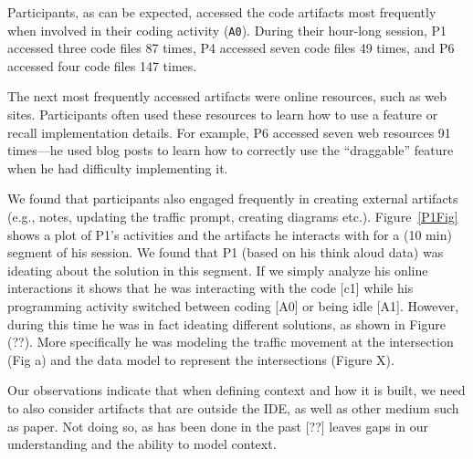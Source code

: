 Participants, as can be expected, accessed the code artifacts most frequently when involved in their coding activity (\texttt{A0}). During their hour-long session, P1 accessed three code files 87 times, P4 accessed seven code files 49 times, and P6 accessed four code files 147 times. 

The next most frequently accessed artifacts were online resources, such as web sites. Participants often used these resources to learn how to use a feature or recall implementation details. For example, P6 accessed seven web resources 91 times---he used blog posts to learn how to correctly use the ``draggable'' feature when he had difficulty implementing it.

We found that participants also engaged frequently in creating external artifacts (e.g., notes, updating the traffic prompt, creating diagrams etc.). Figure~\ref{P1Fig} shows a plot of P1's activities and the artifacts he interacts with for a (10 min) segment of his session. We found that P1 (based on his think aloud data) was ideating about the solution in this segment. If we simply analyze his online interactions it shows that he was interacting with the code [c1] while his programming activity switched between coding [A0] or being idle [A1]. However, during this time he was in fact ideating different solutions, as shown in Figure {\color{red}(??)}. More specifically he was modeling the traffic movement at the intersection {\color{red}(Fig a)} and the data model to represent the  intersections {\color{red}(Figure X)}.



Our observations indicate that when defining context and how it is built, we need to also consider artifacts that are outside the IDE, as well as other medium such as paper. Not doing so, as has been done in the past {\color{red}[??]} leaves gaps in our understanding and the ability to model context.

